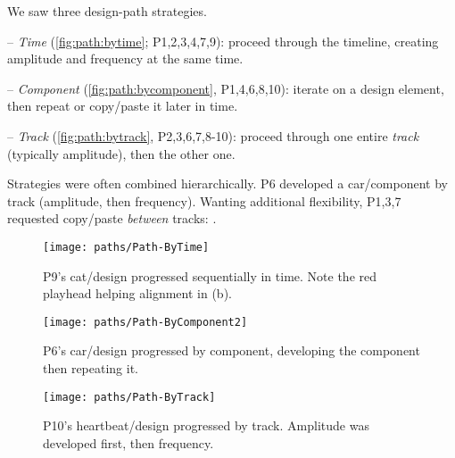 

    We saw three design-path strategies. %
    \par -- \emph{Time} (\autoref{fig:path:bytime};  P1,2,3,4,7,9): proceed through the timeline,  creating  amplitude  and  frequency  at  the  same  time.
    \par -- \emph{Component} (\autoref{fig:path:bycomponent}, P1,4,6,8,10): iterate  on  a  design element,  then  repeat  or  copy/paste it later in time.
    \par -- \emph{Track} (\autoref{fig:path:bytrack},  P2,3,6,7,8-10): proceed through one entire \emph{track} (typically amplitude), then the other one. 
    
\vspace{2px} \noindent Strategies were often combined hierarchically. P6 developed a car/\lo component by track (amplitude, then frequency).
    Wanting additional flexibility,   %
    P1,3,7  requested  copy/paste  \emph{between}  tracks: .
    
\begin{figure} [t]
    \centering
    \texttt{[image: paths/Path-ByTime]}
    \caption{P9's cat/\none design progressed sequentially in time.
    Note the red playhead helping alignment in (b).
     }
    \label{fig:path:bytime}
\end{figure}

\begin{figure} [t]
    \centering
    \texttt{[image: paths/Path-ByComponent2]}
    \caption{P6's car/\lo design progressed by component, developing the component then repeating it.}
    \label{fig:path:bycomponent}
\end{figure}

\begin{figure} [t]
    \centering
    \texttt{[image: paths/Path-ByTrack]}
    \caption{P10's heartbeat/\vis design progressed by track. Amplitude was developed first, then frequency.
    }
    \label{fig:path:bytrack}
\end{figure}

